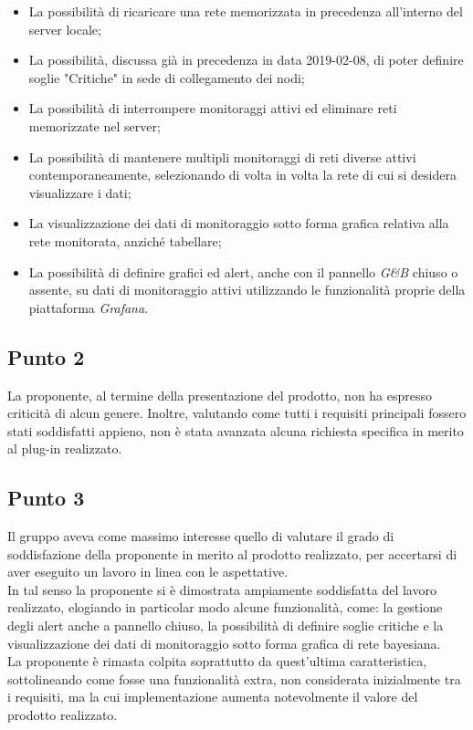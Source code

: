 \begin{itemize}
 \item La possibilità di ricaricare una rete memorizzata in precedenza all'interno del server locale;
 \item La possibilità, discussa già in precedenza in data 2019-02-08, di poter definire soglie "Critiche" in sede di collegamento dei nodi;
 \item La possibilità di interrompere monitoraggi attivi ed eliminare reti memorizzate nel server;
 \item La possibilità di mantenere multipli monitoraggi di reti diverse attivi contemporaneamente, selezionando di volta in volta la rete di cui si desidera visualizzare i dati;
 \item La visualizzazione dei dati di monitoraggio sotto forma grafica relativa alla rete monitorata, anziché tabellare;
 \item La possibilità di definire grafici ed alert, anche con il pannello \textit{G\&B} chiuso o assente, su dati di monitoraggio attivi utilizzando le funzionalità proprie della piattaforma \textit{Grafana}.
\end{itemize}

\subsection{Punto 2}
La proponente, al termine della presentazione del prodotto, non ha espresso criticità di alcun genere. Inoltre, valutando come tutti i requisiti principali fossero stati soddisfatti appieno, non è stata avanzata alcuna richiesta specifica in merito al plug-in realizzato.

\subsection{Punto 3}
Il gruppo aveva come massimo interesse quello di valutare il grado di soddisfazione della proponente in merito al prodotto realizzato, per accertarsi di aver eseguito un lavoro in linea con le aspettative.\\
In tal senso la proponente si è dimostrata ampiamente soddisfatta del lavoro realizzato, elogiando in particolar modo alcune funzionalità, come: la gestione degli alert anche a pannello chiuso, la possibilità di definire soglie critiche e la visualizzazione dei dati di monitoraggio sotto forma grafica di rete bayesiana.\\
La proponente è rimasta colpita soprattutto da quest'ultima caratteristica, sottolineando come fosse una funzionalità extra, non considerata inizialmente tra i requisiti, ma la cui implementazione aumenta notevolmente il valore del prodotto realizzato.

